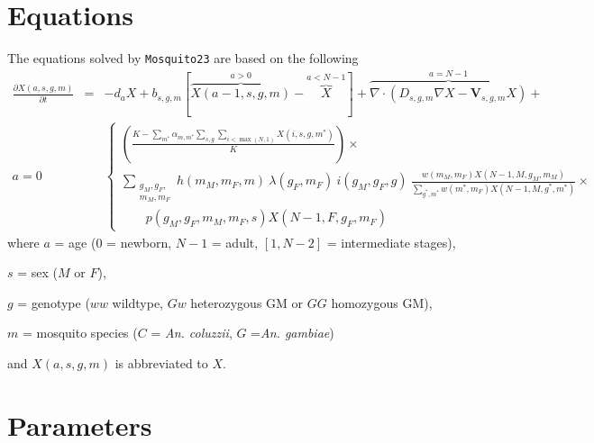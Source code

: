 \documentclass[11pt,a4paper]{article}
\newcommand{\pd}[2]{\frac{\partial #1}{\partial #2}}
\begin{document}
\section{Equations}

The equations solved by {\tt Mosquito23} are based on the following
\begin{eqnarray*}
\pd{X(a,s,g,m)}{t} &=& -d_{a} X + b_{s,g,m} \left[ \overbrace{X(a-1,s,g,m)}^{a>0} - \overbrace{X}^{a<N-1} \right] + \overbrace{\nabla \cdot (D_{s,g,m} \nabla X - \mathbf{V}_{s,g,m} X)}^{a=N-1}
+ \\
a = 0 & & \begin{cases}
\displaystyle \left( \frac{K - \sum_{m^*} \alpha_{m, m^*} \sum_{s,g} \sum_{i<\max(N,1)} X(i,s,g,m^*)}{K} \right) \times \\
\displaystyle \sum_{\substack{g_M, g_F,\\m_M, m_F}}
h(m_M,m_F,m)\ \lambda(g_F, m_F)\ i(g_M, g_F, g)\ \frac{w(m_M, m_F) X(N-1,M,g_M,m_M)}{\sum_{g^*,m^*} w(m^*, m_F) X(N-1,M,g^*,m^*)} \times \\
\qquad p(g_M, g_F, m_M, m_F, s) X(N-1,F,g_F,m_F) 
\end{cases}
\end{eqnarray*}
where $a$ = age ($0$ = newborn, $N-1$ = adult, $[1, N-2]$ = intermediate stages), 

$s$ = sex ($M$ or $F$), 

$g$ = genotype ($ww$ wildtype, $Gw$ heterozygous GM or $GG$ homozygous GM), 

$m$ = mosquito species ($C$ = \textit{An. coluzzii}, $G$ =\textit{An. gambiae})

and $X(a,s,g,m)$ is abbreviated to $X$.


\section{Parameters}
\end{document}
